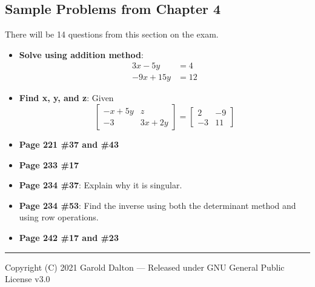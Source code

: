 \documentclass[14pt]{extarticle}
\begin{document}
\subsection*{Sample Problems from Chapter 4}
There will be 14 questions from this section on the exam.
\begin{itemize}
	\item \textbf{Solve using addition method}: 
	\begin{align*} 
		3x - 5y &= 4 \\ 
		-9x + 15y &= 12
	\end{align*}
	
	\item \textbf{Find x, y, and z}:
	Given
	$$\begin{bmatrix}
		-x + 5y & z \\
		-3 & 3x + 2y
	\end{bmatrix}
	= 
	\begin{bmatrix}
		2 & -9 \\
		-3 & 11
	\end{bmatrix}
	$$
	
	\item \textbf{Page 221 \#37 and \#43}
	\item \textbf{Page 233 \#17}
	\item \textbf{Page 234 \#37}: Explain why it is singular.
	\item \textbf{Page 234 \#53}: Find the inverse using both the determinant method and using row operations.
	\item \textbf{Page 242 \#17 and \#23}

\end{itemize}

\noindent\rule{\textwidth}{1pt}
{\footnotesize Copyright (C) 2021 Garold Dalton --- Released under GNU General Public License v3.0}

\cleardoublepage
\end{document}
